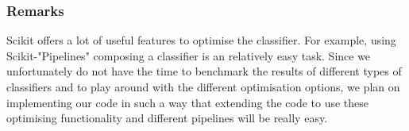\subsubsection{Remarks}
Scikit offers a lot of useful features to optimise the classifier. For example, using Scikit-"Pipelines" composing a classifier is an relatively easy task. Since we unfortunately do not have the time to benchmark the results of different types of classifiers and to play around with the different optimisation options, we plan on implementing our code in such a way that extending the code to use these optimising functionality and different pipelines will be really easy.